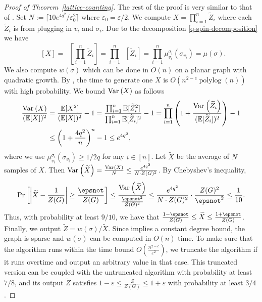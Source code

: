 \documentclass[10pt,a4paper]{article}
\newcommand{\tp}[1]{{\left( #1 \right)}}
\newcommand{\Ex}{\mathop{\mathbb{{}E}}\nolimits}
\renewcommand{\Pr}{\mathop{\mathrm{Pr}}\nolimits}
\newcommand{\polylog}[1]{\ensuremath{\mathop{\mathrm{polylog}}\tp{#1}}}
\newcommand{\abs}[1]{\ensuremath{\left\vert#1\right\vert}}
\newcommand{\eps}{\varepsilon}
\newcommand{\Var}[2]{\ensuremath{\textnormal{Var}_{#1}\left(#2\right)}}
\newcommand{\defeq}{:=}
\begin{document}
\begin{proof}[Proof of Theorem~\ref{lattice-counting}]
  The rest of the proof is very similar to that of .
  Set $N\defeq\lceil10 e^{4q^2}/\eps_0^2\rceil$ where $\eps_0=\eps/2$. 
  We compute $X=\prod_{i=1}^n\widetilde{Z}_i$ where each $\widetilde{Z}_i$ is from  plugging in $v_i$ and $\sigma_i$. Due to the decomposition \eqref{q-spin-decomposition} we have
  \[\Ex[X]=\Ex\left[\prod_{i=1}^n\widetilde{Z}_i\right]=\prod_{i=1}^n\Ex\left[\widetilde{Z}_i\right]=\prod_{i=1}^n\mu_{v_i}^{\sigma_i}(\sigma_{v_i})=\mu(\sigma).\]
  We also compute $w(\sigma)$ which can be done in $O(n)$ on a planar graph with quadratic growth.
  By , the time to generate one $X$ is $O(n^{2-c}\polylog{n})$ with high probability. 
  We bound $\Var{}{X}$ as follows
  \begin{align*}
    \frac{\Var{}{X}}{(\Ex[X])^2}&=\frac{\Ex[X^2]}{(\Ex[X])^2}-1=\frac{\prod_{i=1}^n\Ex[\widetilde{Z}_i^2]}{\prod_{i=1}^n\Ex[\widetilde{Z}_i]^2}-1
    =\prod_{i=1}^n\left(1+\frac{\Var{}{\widetilde{Z}_i}}{(\Ex[\widetilde{Z}_i])^2}\right)-1\\
    &\leq\left(1+\frac{4q^2}{n}\right)^n-1\leq e^{4q^2},
  \end{align*}
  where we use $\mu_{v_i}^{\sigma_i}(\sigma_{v_i})\ge 1/2q$ for any $i\in[n]$.
  Let $\widetilde{X}$ be the average of $N$ samples of $X$. Then $\Var{}{\widetilde{X}}=\frac{\Var{}{X}}{N}\leq\frac{e^{4q^2}}{N\cdot Z(G)^2}$. 
  By Chebyshev's inequality,
  \begin{align*}
    \Pr\left[\abs{\widetilde{X}-\frac{1}{Z(G)}}\ge\frac{\epsnot}{Z(G)}\right]\le\frac{\Var{}{\widetilde{X}}}{\frac{\epsnot^2}{Z(G)^2}} 
    \le \frac{e^{4q^2}}{N\cdot Z(G)^2} \cdot \frac{Z(G)^2}{\epsnot^2}\le \frac{1}{10}.
  \end{align*}
  Thus, with probability at least $9/10$,
  we have that $\frac{1-\epsnot}{Z(G)}\le \widetilde{X} \le \frac{1+\epsnot}{Z(G)}$.
  Finally, we output $\widetilde{Z}=w(\sigma)/\widetilde{X}$.
  Since  implies a constant degree bound, the graph is sparse and $w(\sigma)$ can be computed in $O(n)$ time.
  To make sure that the algorithm runs within the time bound $O\left(\frac{n^{2-c}}{\eps^2}\right)$, 
  we truncate the algorithm if it runs overtime and output an arbitrary value in that case.
  This truncated version can be coupled with the untruncated algorithm with probability at least $7/8$,
  and its output $\widetilde{Z}$ satisfies $1-\eps\le \frac{\widetilde{Z}}{Z(G)}\le 1+\eps$ with probability at least $3/4$.
\end{proof}
\end{document}
